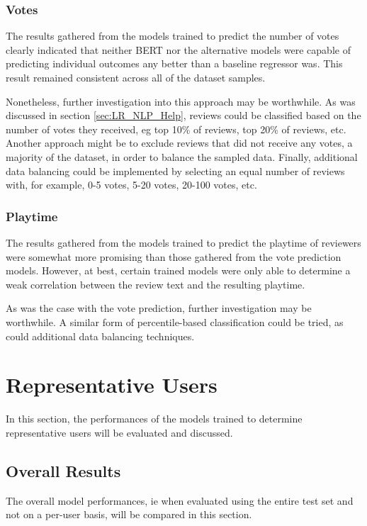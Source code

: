 \subsubsection{Votes}

The results gathered from the models trained to predict the number of votes clearly indicated that neither BERT nor the alternative models were capable of predicting individual outcomes any better than a baseline regressor was. This result remained consistent across all of the dataset samples.

Nonetheless, further investigation into this approach may be worthwhile. As was discussed in section \ref{sec:LR_NLP_Help}, reviews could be classified based on the number of votes they received, eg top 10\% of reviews, top 20\% of reviews, etc. Another approach might be to exclude reviews that did not receive any votes, a majority of the dataset, in order to balance the sampled data. Finally, additional data balancing could be implemented by selecting an equal number of reviews with, for example, 0-5 votes, 5-20 votes, 20-100 votes, etc.

\subsubsection{Playtime}

The results gathered from the models trained to predict the playtime of reviewers were somewhat more promising than those gathered from the vote prediction models. However, at best, certain trained models were only able to determine a weak correlation between the review text and the resulting playtime.

As was the case with the vote prediction, further investigation may be worthwhile. A similar form of percentile-based classification could be tried, as could additional data balancing techniques.

\section{Representative Users} \label{sec:Res_RU}

In this section, the performances of the models trained to determine representative users will be evaluated and discussed.

\subsection{Overall Results}

The overall model performances, ie when evaluated using the entire test set and not on a per-user basis, will be compared in this section.

